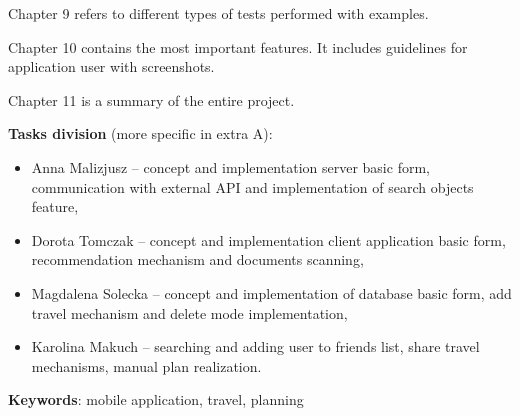 \par Chapter 9 refers to different types of tests performed with examples.

\par Chapter 10 contains the most important features. It includes guidelines for 
application user with screenshots.

\par Chapter 11 is a summary of the entire project.

\par \textbf{Tasks division} (more specific in extra A):
\begin{itemize}
\item Anna Malizjusz -- concept and implementation server basic form, communication with 
external API and implementation of search objects feature,
\item Dorota Tomczak -- concept and implementation client application basic form, 
recommendation mechanism and documents scanning,
\item Magdalena Solecka -- concept and implementation of database basic form, add travel 
mechanism and delete mode implementation,
\item Karolina Makuch -- searching and adding user to friends list, share travel 
mechanisms, manual plan realization.
\end{itemize}
\textbf{Keywords}: mobile application, travel, planning